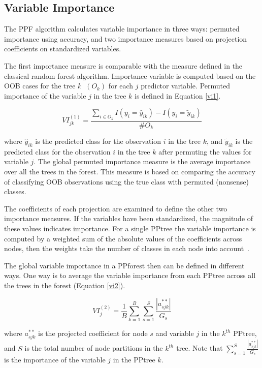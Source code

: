 \documentclass[smallextended,natbib]{svjour3}\usepackage[]{graphicx}\usepackage[]{xcolor}
\begin{document}
\subsection{Variable Importance}

The PPF algorithm calculates variable importance in three ways: permuted importance using accuracy,  and two importance measures based on projection coefficients on standardized variables.

The first importance measure is comparable with the measure defined in the classical random forest algorithm. Importance variable is computed based on the OOB cases for the tree $k\;\;(O_k)$ for each $j$ predictor variable.
Permuted importance of the variable $j$ in the tree $k$ is defined in Equation \ref{vi1}.

\begin{equation}
VI^{(1)} _{jk} = \frac{\sum_{i \in O_k } I(y_i=\hat y_{ik})-I(y_i=\tilde y_{ik})}{\# O_k}
\label{vi1}
\end{equation}

\noindent where $\hat y_{ik}$ is the predicted class for the observation $i$ in the tree $k$, and $\tilde y_{ik}$ is the predicted class for the observation $i$ in the tree $k$ after permuting the values for variable $j$. The global permuted importance measure is the average importance over all the trees in the forest. This measure is based on comparing the accuracy of classifying OOB observations using the true class with permuted (nonsense) classes.

The coefficients of each projection are examined to define the other two importance measures. If the variables have been standardized, the magnitude of these values indicates importance. For a single PPtree the variable importance is computed by a weighted sum of the absolute values of the coefficients across nodes, then the weights take the number of classes in each node into account~\citep{lee2013pptree}.

The global variable importance in a PPforest then can be defined in different ways. One way is to average the variable importance from each PPtree across all the trees in the forest (Equation \ref{vi2}).

\begin{equation}
VI^{(2)}_j=\frac{1}{B}\sum_{k=1}^B \sum_{s= 1}^{S}\frac{|a^{**}_{sjk}|}{G_s }
\label{vi2}
\end{equation}

\noindent where $a^{**}_{sjk}$ is the projected coefficient for node $s$ and variable $j$ in the $k^{th}$ PPtree, and $S$ is the total number of node partitions in the $k^{th}$ tree. Note that $\sum_{s= 1}^{S}\frac{|a^{**}_{sjk}|}{G_s }$ is the importance of the variable $j$ in the PPtree $k$.
\end{document}
